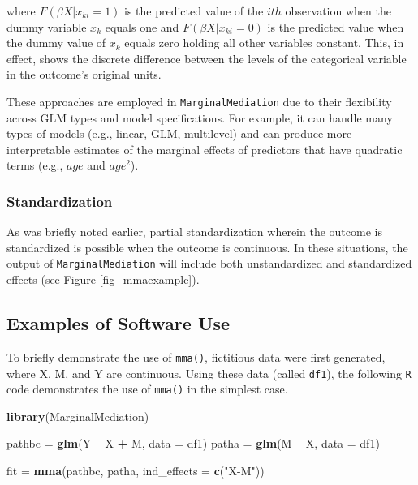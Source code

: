 \documentclass[]{DissertateUSU}
\newenvironment{Shaded}{\begin{snugshade}}{\end{snugshade}}
\newcommand{\KeywordTok}[1]{\textcolor[rgb]{0.13,0.29,0.53}{\textbf{#1}}}
\newcommand{\DataTypeTok}[1]{\textcolor[rgb]{0.13,0.29,0.53}{#1}}
\newcommand{\StringTok}[1]{\textcolor[rgb]{0.31,0.60,0.02}{#1}}
\newcommand{\OperatorTok}[1]{\textcolor[rgb]{0.81,0.36,0.00}{\textbf{#1}}}
\newcommand{\NormalTok}[1]{#1}
\begin{document}
\noindent where \(F(\beta X | x_{ki} = 1)\) is the predicted value of
the \(ith\) observation when the dummy variable \(x_k\) equals one and
\(F(\beta X | x_{ki} = 0)\) is the predicted value when the dummy value
of \(x_k\) equals zero holding all other variables constant. This, in
effect, shows the discrete difference between the levels of the
categorical variable in the outcome's original units.

These approaches are employed in \texttt{MarginalMediation} due to their
flexibility across GLM types and model specifications. For example, it
can handle many types of models (e.g., linear, GLM, multilevel) and can
produce more interpretable estimates of the marginal effects of
predictors that have quadratic terms (e.g., \(age\) and \(age^2\)).

\subsubsection{Standardization}\label{standardization}

As was briefly noted earlier, partial standardization wherein the
outcome is standardized is possible when the outcome is continuous. In
these situations, the output of \texttt{MarginalMediation} will include
both unstandardized and standardized effects (see Figure
\ref{fig_mmaexample}).

\subsection{Examples of Software Use}\label{examples-of-software-use}

To briefly demonstrate the use of \texttt{mma()}, fictitious data were
first generated, where X, M, and Y are continuous. Using these data
(called \texttt{df1}), the following \texttt{R} code demonstrates the
use of \texttt{mma()} in the simplest case.

\singlespacing

\begin{Shaded}
\begin{Highlighting}[]
\KeywordTok{library}\NormalTok{(MarginalMediation)}

\NormalTok{pathbc =}\StringTok{ }\KeywordTok{glm}\NormalTok{(Y }\OperatorTok{~}\StringTok{ }\NormalTok{X }\OperatorTok{+}\StringTok{ }\NormalTok{M, }\DataTypeTok{data =}\NormalTok{ df1)}
\NormalTok{patha  =}\StringTok{ }\KeywordTok{glm}\NormalTok{(M }\OperatorTok{~}\StringTok{ }\NormalTok{X, }\DataTypeTok{data =}\NormalTok{ df1)}

\NormalTok{fit =}\StringTok{ }\KeywordTok{mma}\NormalTok{(pathbc,}
\NormalTok{          patha,}
          \DataTypeTok{ind_effects =} \KeywordTok{c}\NormalTok{(}\StringTok{"X-M"}\NormalTok{))}
\end{Highlighting}
\end{Shaded}
\end{document}
